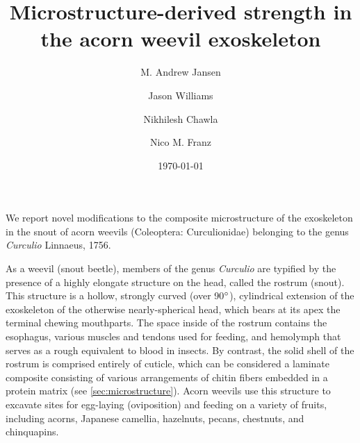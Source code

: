 \documentclass[twocolumn, linenumbers, superscriptaddress]{revtex4-1}
\begin{document}
	\begin{abstract}
		\blindtext
	\end{abstract}
	
	{\title{Microstructure-derived strength in the acorn weevil exoskeleton}
	
	\date{\today}
	
	\author{M. Andrew Jansen}
	\author{Jason Williams}
	\author{Nikhilesh Chawla}
	\author{Nico M. Franz}
		
	\maketitle
	}
	


	We report novel modifications to the composite microstructure of the exoskeleton in the snout of acorn weevils (Coleoptera: Curculionidae) belonging to the genus \textit{Curculio} Linnaeus, 1756.

	As a weevil (snout beetle), members of the genus \textit{Curculio} are typified by the presence of a highly elongate structure on the head, called the rostrum (snout). 
	This structure is a hollow, strongly curved (over 90$\degree$), cylindrical extension of the exoskeleton of the otherwise nearly-spherical head, which bears at its apex the terminal chewing mouthparts. 
	The space inside of the rostrum contains the esophagus, various muscles and tendons used for feeding, and hemolymph that serves as a rough equivalent to blood in insects.
	By contrast, the solid shell of the rostrum is comprised entirely of cuticle, which can be considered a laminate composite consisting of various arrangements of chitin fibers embedded in a protein matrix (see \cref{sec:microstructure}).
	Acorn weevils use this structure to excavate sites for egg-laying (oviposition) and feeding on a variety of fruits, including acorns, Japanese camellia, hazelnuts, pecans, chestnuts, and chinquapins. 
		
\end{document}
